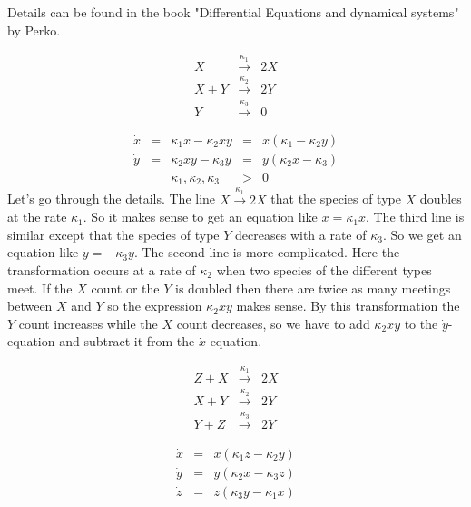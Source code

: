 \documentclass{article}
\begin{document}
Details can be found in the book "Differential Equations and dynamical systems" by Perko.

\begin{exam}
    $$\begin{array}{rcl}
    X &\stackrel{\kappa_1}{\to}& 2X\\
    X+Y &\stackrel{\kappa_2}{\to}& 2Y\\
    Y &\stackrel{\kappa_3}{\to}& 0
    \end{array}$$

    $$\begin{array}{rcccl}\dot x &=&\kappa_1x-\kappa_2xy &=& x(\kappa_1-\kappa_2y)\\
    \dot y&=&\kappa_2xy-\kappa_3y &=& y(\kappa_2x-\kappa_3)\\
    &&\kappa_1,\kappa_2, \kappa_3 &>& 0
    \end{array}$$
    Let's go through the details. The line $X \stackrel{\kappa_1}{\to} 2X$ that the species of type $X$ doubles at the rate $\kappa_1$. So it makes sense to get an equation like $\dot x =\kappa_1x$. The third line is similar except that the species of type $Y$ decreases with a rate of $\kappa_3$. So we get an equation like $\dot y=-\kappa_3y$. The second line is more complicated. Here the transformation occurs at a rate of $\kappa_2$ when two species of the different types meet. If the $X$ count or the $Y$ is doubled then there are twice as many meetings between $X$ and $Y$ so the expression $\kappa_2xy$ makes sense. By this transformation the $Y$ count increases while the $X$ count decreases, so we have to add $\kappa_2xy$ to the $\dot y$-equation and subtract it from the $\dot x$-equation.
\end{exam}

\begin{exam}
    $$\begin{array}{rcl}Z+X &\stackrel{\kappa_1}{\to}& 2X\\
    X+Y &\stackrel{\kappa_2}{\to}& 2Y\\
    Y+Z &\stackrel{\kappa_3}{\to}& 2Y
    \end{array}$$



    $$\begin{array}{rcl}\dot x &=& x(\kappa_1z - \kappa_2y)\\
    \dot y &=& y(\kappa_2x - \kappa_3z)\\
    \dot z &=& z(\kappa_3y - \kappa_1x)\end{array}$$
\end{exam}
\end{document}
